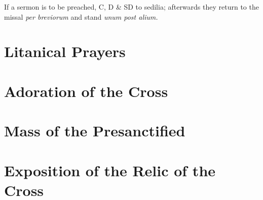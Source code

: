 {\rubric If a sermon is to be preached, C, D \& SD to sedilia; afterwards they
return to the missal \textit{per breviorum} and stand \textit{unum post alium.}

\section{Litanical Prayers}

\section{Adoration of the Cross}

\section{Mass of the Presanctified}

\section{Exposition of the Relic of the Cross}

}


